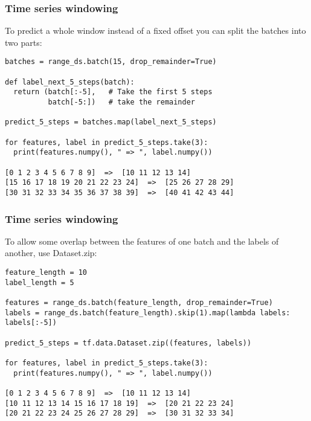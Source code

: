 \begin{frame}[fragile]\frametitle{Time series windowing}

To predict a whole window instead of a fixed offset you can split the batches into two parts:


\begin{lstlisting}
batches = range_ds.batch(15, drop_remainder=True)

def label_next_5_steps(batch):
  return (batch[:-5],   # Take the first 5 steps
          batch[-5:])   # take the remainder

predict_5_steps = batches.map(label_next_5_steps)

for features, label in predict_5_steps.take(3):
  print(features.numpy(), " => ", label.numpy())
	
[0 1 2 3 4 5 6 7 8 9]  =>  [10 11 12 13 14]
[15 16 17 18 19 20 21 22 23 24]  =>  [25 26 27 28 29]
[30 31 32 33 34 35 36 37 38 39]  =>  [40 41 42 43 44]
\end{lstlisting}
\end{frame}

\begin{frame}[fragile]\frametitle{Time series windowing}

To allow some overlap between the features of one batch and the labels of another, use Dataset.zip:



\begin{lstlisting}
feature_length = 10
label_length = 5

features = range_ds.batch(feature_length, drop_remainder=True)
labels = range_ds.batch(feature_length).skip(1).map(lambda labels: labels[:-5])

predict_5_steps = tf.data.Dataset.zip((features, labels))

for features, label in predict_5_steps.take(3):
  print(features.numpy(), " => ", label.numpy())
	
[0 1 2 3 4 5 6 7 8 9]  =>  [10 11 12 13 14]
[10 11 12 13 14 15 16 17 18 19]  =>  [20 21 22 23 24]
[20 21 22 23 24 25 26 27 28 29]  =>  [30 31 32 33 34]
\end{lstlisting}
\end{frame}

